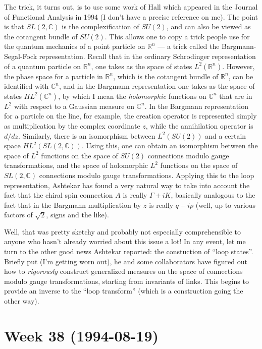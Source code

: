 \documentclass{article}
\begin{document}
The trick, it turns out, is to use some work of Hall which appeared in
the Journal of Functional Analysis in 1994 (I don't have a precise
reference on me). The point is that \(SL(2,\mathbb{C})\) is the
complexification of \(SU(2)\), and can also be viewed as the cotangent
bundle of \(SU(2)\). This allows one to copy a trick people use for the
quantum mechanics of a point particle on \(\mathbb{R}^n\) --- a trick
called the Bargmann-Segal-Fock representation. Recall that in the
ordinary Schrodinger representation of a quantum particle on
\(\mathbb{R}^n\), one takes as the space of states
\(L^2(\mathbb{R}^n)\). However, the phase space for a particle in
\(\mathbb{R}^n\), which is the cotangent bundle of \(\mathbb{R}^n\), can
be identified with \(\mathbb{C}^n\), and in the Bargmann representation
one takes as the space of states \(HL^2(\mathbb{C}^n)\), by which I mean
the \emph{holomorphic} functions on \(\mathbb{C}^n\) that are in \(L^2\)
with respect to a Gaussian measure on \(\mathbb{C}^n\). In the Bargmann
representation for a particle on the line, for example, the creation
operator is represented simply as multiplication by the complex
coordinate \(z\), while the annihilation operator is \(d/dz\).
Similarly, there is an isomorphism between \(L^2(SU(2))\) and a certain
space \(HL^2(SL(2,\mathbb{C}))\). Using this, one can obtain an
isomorphism between the space of \(L^2\) functions on the space of
\(SU(2)\) connections modulo gauge transformations, and the space of
holomorphic \(L^2\) functions on the space of \(SL(2,\mathbb{C})\)
connections modulo gauge transformations. Applying this to the loop
representation, Ashtekar has found a very natural way to take into
account the fact that the chiral spin connection \(A\) is really
\(\Gamma + iK\), basically analogous to the fact that in the Bargmann
multiplication by \(z\) is really \(q + ip\) (well, up to various
factors of \(\sqrt{2}\), signs and the like).

Well, that was pretty sketchy and probably not especially comprehensible
to anyone who hasn't already worried about this issue a lot! In any
event, let me turn to the other good news Ashtekar reported: the
constuction of ``loop states''. Briefly put (I'm getting worn out), he
and some collaborators have figured out how to \emph{rigorously}
construct generalized measures on the space of connections modulo gauge
transformations, starting from invariants of links. This begins to
provide an inverse to the ``loop transform'' (which is a construction
going the other way).
\hypertarget{week38}{%
\section{Week 38 (1994-08-19)}\label{week38}}
\end{document}
